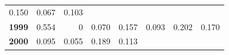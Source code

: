 \documentclass[]{article}
\begin{document}
\begin{longtable}[]{@{}rrrrrrrr@{}}
\begin{minipage}[t]{0.09\columnwidth}
0.150\strut
\end{minipage} & \begin{minipage}[t]{0.08\columnwidth}\raggedleft\strut
0.067\strut
\end{minipage} & \begin{minipage}[t]{0.10\columnwidth}\raggedleft\strut
0.103\strut
\end{minipage}\tabularnewline
\begin{minipage}[t]{0.08\columnwidth}\raggedleft\strut
\textbf{1999}\strut
\end{minipage} & \begin{minipage}[t]{0.10\columnwidth}\raggedleft\strut
0.554\strut
\end{minipage} & \begin{minipage}[t]{0.11\columnwidth}\raggedleft\strut
0\strut
\end{minipage} & \begin{minipage}[t]{0.08\columnwidth}\raggedleft\strut
0.070\strut
\end{minipage} & \begin{minipage}[t]{0.14\columnwidth}\raggedleft\strut
0.157\strut
\end{minipage} & \begin{minipage}[t]{0.09\columnwidth}\raggedleft\strut
0.093\strut
\end{minipage} & \begin{minipage}[t]{0.08\columnwidth}\raggedleft\strut
0.202\strut
\end{minipage} & \begin{minipage}[t]{0.10\columnwidth}\raggedleft\strut
0.170\strut
\end{minipage}\tabularnewline
\begin{minipage}[t]{0.08\columnwidth}\raggedleft\strut
\textbf{2000}\strut
\end{minipage} & \begin{minipage}[t]{0.10\columnwidth}\raggedleft\strut
0.095\strut
\end{minipage} & \begin{minipage}[t]{0.11\columnwidth}\raggedleft\strut
0.055\strut
\end{minipage} & \begin{minipage}[t]{0.08\columnwidth}\raggedleft\strut
0.189\strut
\end{minipage} & \begin{minipage}[t]{0.14\columnwidth}\raggedleft\strut
0.113\strut
\end{minipage} & \begin{minipage}[t]{0.09\columnwidth}\raggedleft\strut

\end{minipage}
\end{longtable}
\end{document}
